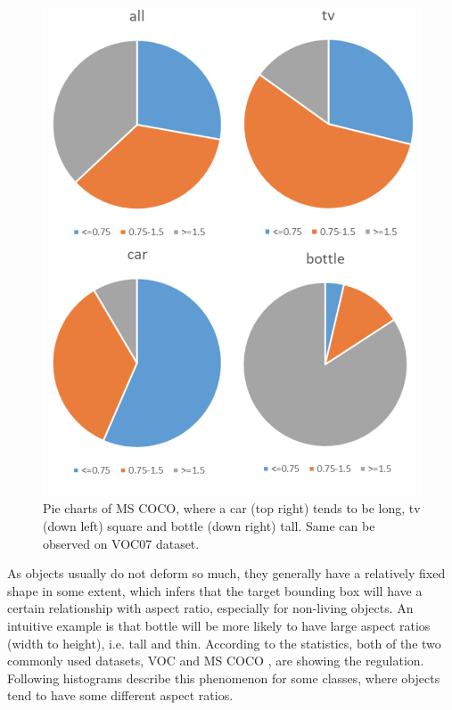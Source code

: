 \documentclass[10pt,twocolumn,letterpaper]{article}
\begin{document}
\begin{figure}[h]
\centering
\includegraphics[width=1\linewidth]{pic/dist_pics/pies_coco}
\caption{Pie charts of MS COCO\cite{coco}, where a car (top right) tends to be long, tv (down left) square and bottle (down right) tall. Same can be observed on VOC07\cite{voc07} dataset.}
\label{fig:piescoco}
\end{figure}
As objects usually do not deform so much, they generally have a relatively fixed shape in some extent, which infers that the target bounding box will have a certain relationship with aspect ratio, especially for non-living objects. An intuitive example is that bottle will be more likely to have large aspect ratios (width to height), i.e. tall and thin. According to the statistics, both of the two commonly used datasets, VOC \cite{voc07} and MS COCO \cite{coco}, are showing the regulation. Following histograms describe this phenomenon for some classes, where objects tend to have some different aspect ratios. 

\end{document}
